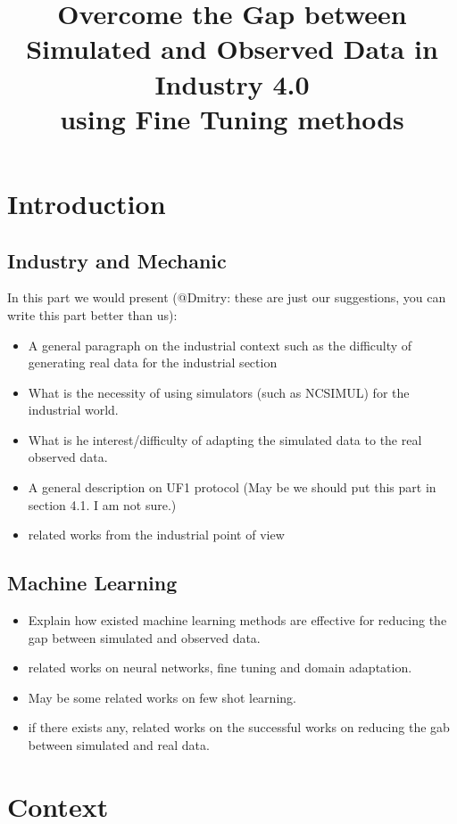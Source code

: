 \documentclass{article}
\title{Overcome the Gap between Simulated and Observed Data in Industry 4.0\\ using Fine Tuning methods}
\begin{document}
\maketitle

\section{Introduction}

\subsection{Industry and Mechanic}
In this part we would present (@Dmitry: these are just our suggestions, you can write this part better than us):
\begin{itemize}
\item A general paragraph on the industrial context such as the difficulty of generating real data for the industrial section
\item What is the necessity of using simulators (such as NCSIMUL) for the industrial world. 
\item What is he interest/difficulty of adapting the simulated data to the real observed data.
\item A general description on UF1 protocol (May be we should put this part in section 4.1. I am not sure.)
\item related works from the industrial point of view
\end{itemize}
 
\subsection{Machine Learning}
\begin{itemize}
	\item Explain how existed machine learning methods are effective for reducing the gap between simulated and observed data.
    \item related works on neural networks, fine tuning and domain adaptation.
    \item May be some related works on few shot learning. 
    \item if there exists any, related works on the successful works on reducing the gab between  simulated and real data.
\end{itemize}
\section{Context}
\end{document}
